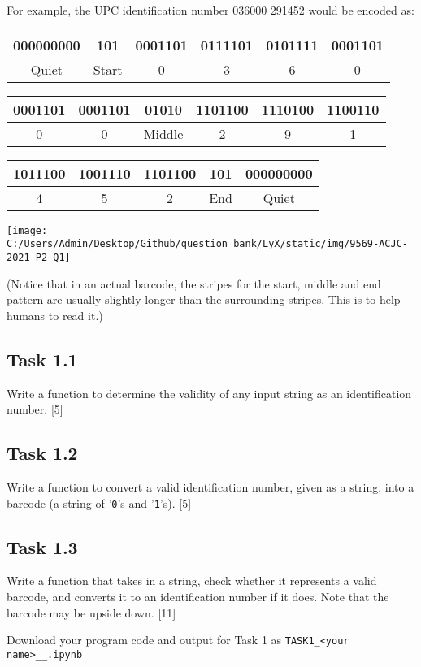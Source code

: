 \noindent For example, the UPC identification number 036000 291452
would be encoded as:

\begin{tabular}{|c|c|c|c|c|c|}
\hline 
000000000 & 101 & 0001101 & 0111101 & 0101111 & 0001101\tabularnewline
\hline 
Quiet & Start & 0 & 3  & 6  & 0\tabularnewline
\hline 
\end{tabular}

\begin{tabular}{|c|c|c|c|c|c|}
\hline 
0001101  & 0001101  & 01010 & 1101100  & 1110100  & 1100110\tabularnewline
\hline 
0  & 0  & Middle & 2  & 9  & 1\tabularnewline
\hline 
\end{tabular}

\begin{tabular}{|c|c|c|c|c|}
\hline 
1011100 & 1001110  & 1101100  & 101 & 000000000 \tabularnewline
\hline 
4  & 5  & 2  & End & Quiet\tabularnewline
\hline 
\end{tabular}
\noindent \begin{center}
\texttt{[image: C:/Users/Admin/Desktop/Github/question\_bank/LyX/static/img/9569-ACJC-2021-P2-Q1]}
\par\end{center}

\noindent (Notice that in an actual barcode, the stripes for the start,
middle and end pattern are usually slightly longer than the surrounding
stripes. This is to help humans to read it.)

\subsection*{Task 1.1}

\noindent Write a function to determine the validity of any input
string as an identification number. \hfill{}{[}5{]}

\subsection*{Task 1.2}

\noindent Write a function to convert a valid identification number,
given as a string, into a barcode (a string of '\texttt{0}'s and '\texttt{1}'s).
\hfill{}{[}5{]}

\subsection*{Task 1.3}

\noindent Write a function that takes in a string, check whether it
represents a valid barcode, and converts it to an identification number
if it does. Note that the barcode may be upside down. \hfill{}{[}11{]}

\noindent Download your program code and output for Task 1 as \texttt{TASK1\_<your
name>\_<centre number>\_<index number>.ipynb}